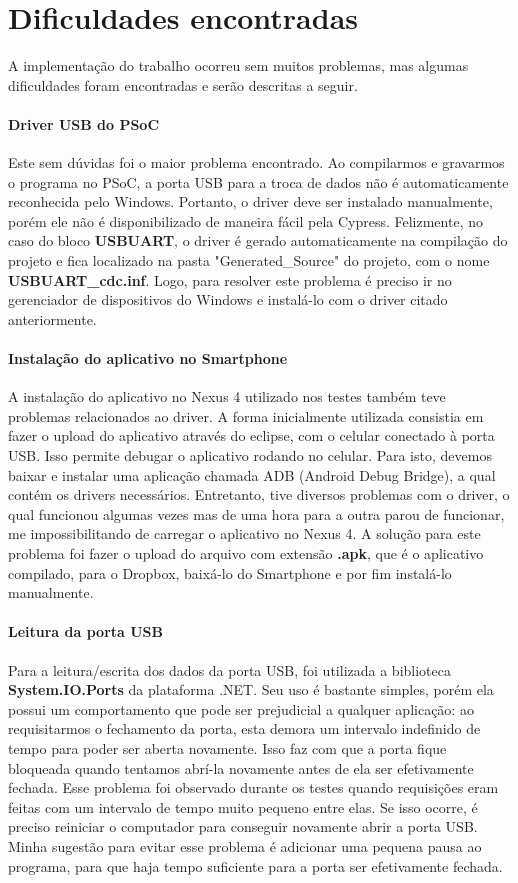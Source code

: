 \documentclass[a4paper,12pt,titlepage]{article}
\begin{document}
\section{Dificuldades encontradas}
	A implementação do trabalho ocorreu sem muitos problemas, mas algumas dificuldades foram encontradas e serão descritas a seguir.
	\paragraph{Driver USB do PSoC} Este sem dúvidas foi o maior problema encontrado. Ao compilarmos e gravarmos o programa no PSoC, a porta USB para a troca de dados não é automaticamente reconhecida pelo Windows. Portanto, o driver deve ser instalado manualmente, porém ele não é disponibilizado de maneira fácil pela Cypress. Felizmente, no caso do bloco \textbf{USBUART}, o driver é gerado automaticamente na compilação do projeto e fica localizado na pasta "Generated\_Source" do projeto, com o nome \textbf{USBUART\_cdc.inf}. Logo, para resolver este problema é preciso ir no gerenciador de dispositivos do Windows e instalá-lo com o driver citado anteriormente.
	
	\paragraph{Instalação do aplicativo no Smartphone} 
	A instalação do aplicativo no Nexus 4 utilizado nos testes também teve problemas relacionados ao driver. A forma inicialmente utilizada consistia em fazer o upload do aplicativo através do eclipse, com o celular conectado à porta USB. Isso permite debugar o aplicativo rodando no celular. Para isto, devemos baixar e instalar uma aplicação chamada ADB (Android Debug Bridge), a qual contém os drivers necessários. Entretanto, tive diversos problemas com o driver, o qual funcionou algumas vezes mas de uma hora para a outra parou de funcionar, me impossibilitando de carregar o aplicativo no Nexus 4. A solução para este problema foi fazer o upload do arquivo com extensão \textbf{.apk}, que é o aplicativo compilado, para o Dropbox, baixá-lo do Smartphone e por fim instalá-lo manualmente.
	
	\paragraph{Leitura da porta USB}
	Para a leitura/escrita dos dados da porta USB, foi utilizada a biblioteca \textbf{System.IO.Ports} da plataforma .NET. Seu uso é bastante simples, porém ela possui um comportamento que pode ser prejudicial a qualquer aplicação: ao requisitarmos o fechamento da porta, esta demora um intervalo indefinido de tempo para poder ser aberta novamente. Isso faz com que a porta fique bloqueada quando tentamos abrí-la novamente antes de ela ser efetivamente fechada. Esse problema foi observado durante os testes quando requisições eram feitas com um intervalo de tempo muito pequeno entre elas. Se isso ocorre, é preciso reiniciar o computador para conseguir novamente abrir a porta USB. Minha sugestão para evitar esse problema é adicionar uma pequena pausa ao programa, para que haja tempo suficiente para a porta ser efetivamente fechada.
	
\end{document}
